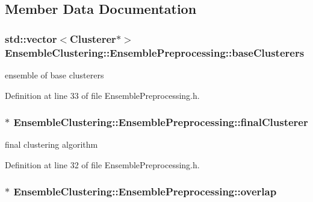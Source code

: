 \subsection{Member Data Documentation}
\hypertarget{class_ensemble_clustering_1_1_ensemble_preprocessing_ad1b46c5bc0b21e5289c49ec24c100cc6}{
\subsubsection[{base\-Clusterers}]{\setlength{\rightskip}{0pt plus 5cm}std\-::vector$<${\bf Clusterer}$\ast$$>$ Ensemble\-Clustering\-::\-Ensemble\-Preprocessing\-::base\-Clusterers\hspace{0.3cm}{\ttfamily [protected]}}}\label{class_ensemble_clustering_1_1_ensemble_preprocessing_ad1b46c5bc0b21e5289c49ec24c100cc6}


ensemble of base clusterers 



Definition at line 33 of file Ensemble\-Preprocessing.\-h.

\hypertarget{class_ensemble_clustering_1_1_ensemble_preprocessing_a91f4489dd228389ee10e72640d5771e9}{
\subsubsection[{final\-Clusterer}]{$\ast$ Ensemble\-Clustering\-::\-Ensemble\-Preprocessing\-::final\-Clusterer\hspace{0.3cm}{\ttfamily [protected]}}}\label{class_ensemble_clustering_1_1_ensemble_preprocessing_a91f4489dd228389ee10e72640d5771e9}


final clustering algorithm 



Definition at line 32 of file Ensemble\-Preprocessing.\-h.

\hypertarget{class_ensemble_clustering_1_1_ensemble_preprocessing_a6f2615ff4946f64592f6c4ef727a34f7}{
\subsubsection[{overlap}]{$\ast$ Ensemble\-Clustering\-::\-Ensemble\-Preprocessing\-::overlap\hspace{0.3cm}{\ttfamily [protected]}}}\label{class_ensemble_clustering_1_1_ensemble_preprocessing_a6f2615ff4946f64592f6c4ef727a34f7}


